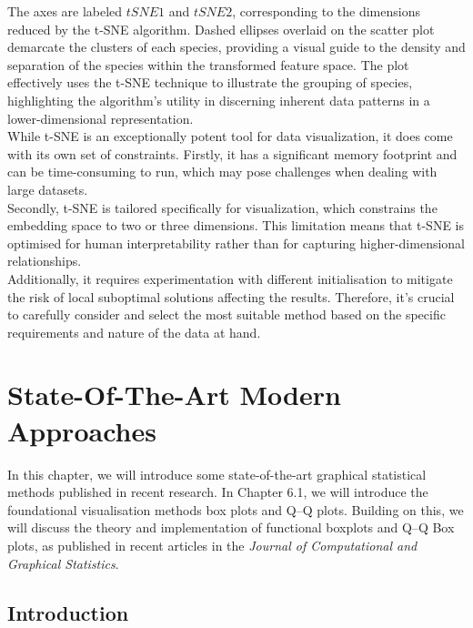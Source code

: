 \documentclass{article}\usepackage[]{graphicx}\usepackage[]{xcolor}
\numberwithin{equation}{section}
\begin{document}
\noindent
The axes are labeled $tSNE1$ and $tSNE2$, corresponding to the dimensions reduced by the t-SNE algorithm. Dashed ellipses overlaid on the scatter plot demarcate the clusters of each species, providing a visual guide to the density and separation of the species within the transformed feature space. The plot effectively uses the t-SNE technique to illustrate the grouping of species, highlighting the algorithm's utility in discerning inherent data patterns in a lower-dimensional representation.\\

\noindent
While t-SNE is an exceptionally potent tool for data visualization, it does come with its own set of constraints. Firstly, it has a significant memory footprint and can be time-consuming to run, which may pose challenges when dealing with large datasets.\\

\noindent
Secondly, t-SNE is tailored specifically for visualization, which constrains the embedding space to two or three dimensions. This limitation means that t-SNE is optimised for human interpretability rather than for capturing higher-dimensional relationships.\\

\noindent
Additionally, it requires experimentation with different initialisation to mitigate the risk of local suboptimal solutions affecting the results. Therefore, it's crucial to carefully consider and select the most suitable method based on the specific requirements and nature of the data at hand.

\newpage 

\section{State-Of-The-Art Modern Approaches}

In this chapter, we will introduce some state-of-the-art graphical statistical methods published in recent research. In Chapter 6.1, we will introduce the foundational visualisation methods box plots and Q–Q plots. Building on this, we will discuss the theory and implementation of functional boxplots and Q–Q Box plots, as published in recent articles in the \textit{Journal of Computational and Graphical Statistics}. 

\subsection{Introduction}
\end{document}
